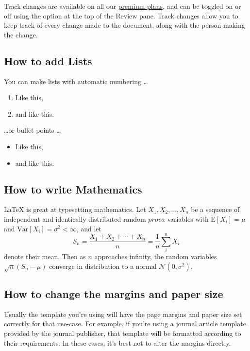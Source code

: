 \documentclass{article}
\begin{document}
	Track changes are available on all our \href{https://www.overleaf.com/user/subscription/plans}{premium plans}, and can be toggled on or off using the option at the top of the Review pane. Track changes allow you to keep track of every change made to the document, along with the person making the change. 
	
	\subsection{How to add Lists}
	
	You can make lists with automatic numbering \dots
	
	\begin{enumerate}
		\item Like this,
		\item and like this.
	\end{enumerate}
	\dots or bullet points \dots
	\begin{itemize}
		\item Like this,
		\item and like this.
	\end{itemize}
	
	\subsection{How to write Mathematics}
	
	\LaTeX{} is great at typesetting mathematics. Let $X_1, X_2, \ldots, X_n$ be a sequence of independent and identically distributed random $prova $ variables with $\text{E}[X_i] = \mu$ and $\text{Var}[X_i] = \sigma^2 < \infty$, and let
	\[S_n = \frac{X_1 + X_2 + \cdots + X_n}{n}
	= \frac{1}{n}\sum_{i}^{n} X_i\]
	denote their mean. Then as $n$ approaches infinity, the random variables $\sqrt{n}(S_n - \mu)$ converge in distribution to a normal $\mathcal{N}(0, \sigma^2)$.
	
	
	\subsection{How to change the margins and paper size}
	
	Usually the template you're using will have the page margins and paper size set correctly for that use-case. For example, if you're using a journal article template provided by the journal publisher, that template will be formatted according to their requirements. In these cases, it's best not to alter the margins directly.
	
\end{document}
